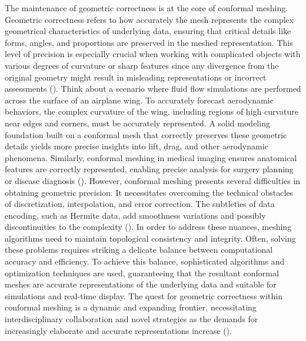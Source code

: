 The maintenance of geometric correctness is at the core of conformal meshing. Geometric correctness refers to how accurately the mesh represents the complex geometrical characteristics of underlying data, ensuring that critical details like forms, angles, and proportions are preserved in the meshed representation. This level of precision is especially crucial when working with complicated objects with various degrees of curvature or sharp features since any divergence from the original geometry might result in misleading representations or incorrect assessments (\cite{Benkler_2008}). Think about a scenario where fluid flow simulations are performed across the surface of an airplane wing. To accurately forecast aerodynamic behaviors, the complex curvature of the wing, including regions of high curvature near edges and corners, must be accurately represented. A solid modeling foundation built on a conformal mesh that correctly preserves these geometric details yields more precise insights into lift, drag, and other aerodynamic phenomena. Similarly, conformal meshing in medical imaging ensures anatomical features are correctly represented, enabling precise analysis for surgery planning or disease diagnosis (\cite{Chen_2022}). 
However, conformal meshing presents several difficulties in obtaining geometric precision. It necessitates overcoming the technical obstacles of discretization, interpolation, and error correction. The subtleties of data encoding, such as Hermite data, add smoothness variations and possibly discontinuities to the complexity (\cite{Chen_2022}). In order to address these nuances, meshing algorithms need to maintain topological consistency and integrity. Often, solving these problems requires striking a delicate balance between computational accuracy and efficiency. To achieve this balance, sophisticated algorithms and optimization techniques are used, guaranteeing that the resultant conformal meshes are accurate representations of the underlying data and suitable for simulations and real-time display. The quest for geometric correctness within conformal meshing is a dynamic and expanding frontier, necessitating interdisciplinary collaboration and novel strategies as the demands for increasingly elaborate and accurate representations increase (\cite{Benkler_2008}).

